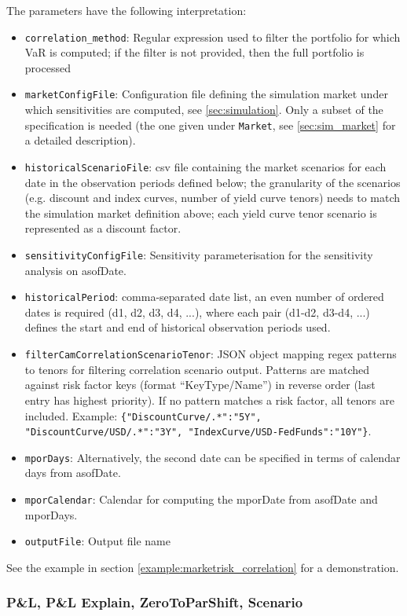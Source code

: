 The parameters have the following interpretation:

\begin{itemize}
\item {\tt correlation\_method}: Regular expression used to filter the portfolio for which VaR is computed; if the filter is not provided, then the full portfolio is processed
\item {\tt marketConfigFile}: Configuration file defining the simulation market under which sensitivities are computed,
  see \ref{sec:simulation}. Only a subset of the specification is needed (the one given under {\tt Market}, see
  \ref{sec:sim_market} for a detailed description).
\item {\tt historicalScenarioFile}: csv file containing the market scenarios for each date in the observation periods defined below; the granularity of the scenarios (e.g. discount and index curves, number of yield curve tenors) needs to match the simulation market definition above; each yield curve tenor scenario is represented as a discount factor.
\item {\tt sensitivityConfigFile}: Sensitivity parameterisation for the sensitivity analysis on asofDate.
\item {\tt historicalPeriod}: comma-separated date list, an even number of ordered dates is required (d1, d2, d3, d4, ...), where each pair (d1-d2, d3-d4, ...) defines the start and end of historical observation periods used.
\item {\tt filterCamCorrelationScenarioTenor}: JSON object mapping regex patterns to tenors for filtering correlation scenario output. Patterns are matched against risk factor keys (format ``KeyType/Name'') in reverse order (last entry has highest priority). If no pattern matches a risk factor, all tenors are included. Example: \verb+{"DiscountCurve/.*":"5Y", "DiscountCurve/USD/.*":"3Y", "IndexCurve/USD-FedFunds":"10Y"}+.
\item {\tt mporDays}: Alternatively, the second date can be specified in terms of calendar days from asofDate.
\item {\tt mporCalendar}: Calendar for computing the mporDate from asofDate and mporDays.
\item {\tt outputFile}: Output file name
\end{itemize}

See the example in section \ref{example:marketrisk_correlation} for a demonstration.

\subsubsection{P\&L, P\&L Explain, ZeroToParShift, Scenario}

